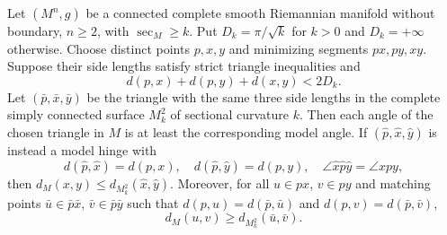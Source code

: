 Let \((M^n,g)\) be a connected complete smooth Riemannian manifold without boundary, \(n\ge2\), with \(\sec_M\ge k\). Put \(D_k=\pi/\sqrt{k}\) for \(k>0\) and \(D_k=+\infty\) otherwise. Choose distinct points \(p,x,y\) and minimizing segments \(px,py,xy\). Suppose their side lengths satisfy strict triangle inequalities and
\[
d(p,x)+d(p,y)+d(x,y)<2D_k.
\]
Let \((\bar p,\bar x,\bar y)\) be the triangle with the same three side lengths in the complete simply connected surface \(M_k^2\) of sectional curvature \(k\). Then each angle of the chosen triangle in \(M\) is at least the corresponding model angle.
If \((\hat p,\hat x,\hat y)\) is instead a model hinge with
\[
d(\hat p,\hat x)=d(p,x),\quad d(\hat p,\hat y)=d(p,y),\quad
\angle\hat x\hat p\hat y=\angle xpy,
\]
then \(d_M(x,y)\le d_{M_k^2}(\hat x,\hat y)\).
Moreover, for all \(u\in px\), \(v\in py\) and matching points \(\bar u\in\bar p\bar x\), \(\bar v\in\bar p\bar y\) such that
\(d(p,u)=d(\bar p,\bar u)\) and \(d(p,v)=d(\bar p,\bar v)\),
\[
d_M(u,v)\ge d_{M_k^2}(\bar u,\bar v).
\]